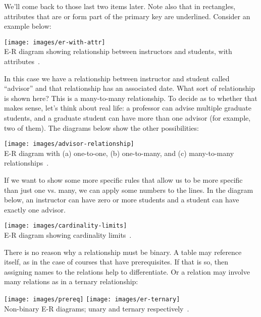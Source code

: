 We'll come back to those last two items later. Note also that in rectangles, attributes that are or form part of the primary key are underlined. Consider an example below:

\begin{center}
\texttt{[image: images/er-with-attr]}\\
E-R diagram showing relationship between instructors and students, with attributes~\cite{dsc}.
\end{center}

In this case we have a relationship between instructor and student called ``advisor'' and that relationship has an associated date. What sort of relationship is shown here? This is a many-to-many relationship. To decide as to whether that makes sense, let's think about real life: a professor can advise multiple graduate students, and a graduate student can have more than one advisor (for example, two of them). The diagrams below show the other possibilities:

\begin{center}
\texttt{[image: images/advisor-relationship]}\\
E-R diagram with (a) one-to-one, (b) one-to-many, and (c) many-to-many relationships~\cite{dsc}.
\end{center}

If we want to show some more specific rules that allow us to be more specific than just one vs. many, we can apply some numbers to the lines. In the diagram below, an instructor can have zero or more students and a student can have exactly one advisor.

\begin{center}
\texttt{[image: images/cardinality-limits]}\\
E-R diagram showing cardinality limits~\cite{dsc}.
\end{center}

There is no reason why a relationship must be binary. A table may reference itself, as in the case of courses that have prerequisites. If that is so, then assigning names to the relations help to differentiate. Or a relation may involve many relations as in a ternary relationship:

\begin{center}
\texttt{[image: images/prereq]}
\texttt{[image: images/er-ternary]}\\
Non-binary E-R diagrams; unary and ternary respectively~\cite{dsc}.
\end{center}


